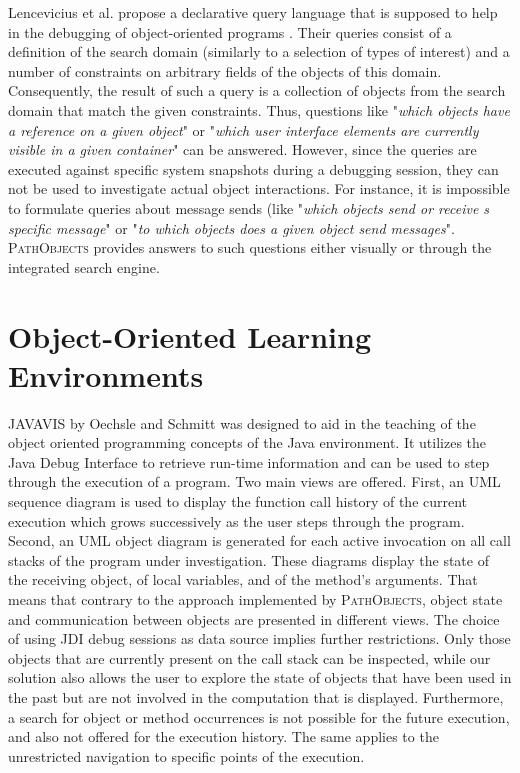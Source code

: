 Lencevicius et al. propose a declarative query language that is supposed to help in the debugging of object-oriented programs \cite{lencevicius_query-based_1997, guerraoui_dynamic_1999}.
Their queries consist of a definition of the search domain (similarly to a selection of types of interest) and a number of constraints on arbitrary fields of the objects of this domain.
Consequently, the result of such a query is a collection of objects from the search domain that match the given constraints.
Thus, questions like "\textit{which objects have a reference on a given object}" or "\textit{which user interface elements are currently visible in a given container}" can be answered.
However, since the queries are executed against specific system snapshots during a debugging session, they can not be used to investigate actual object interactions.
For instance, it is impossible to formulate queries about message sends (like "\textit{which objects send or receive s specific message}" or "\textit{to which objects does a given object send messages}".
\textsc{PathObjects} provides answers to such questions either visually or through the integrated search engine.

\section{Object-Oriented Learning Environments}
\textsc{JAVAVIS} by Oechsle and Schmitt \cite{diehl_javavis:_2002} was designed to aid in the teaching of the object oriented programming concepts of the Java environment.
It utilizes the Java Debug Interface to retrieve run-time information and can be used to step through the execution of a program.
Two main views are offered.
First, an UML sequence diagram is used to display the function call history of the current execution which grows successively as the user steps through the program.
Second, an UML object diagram is generated for each active invocation on all call stacks of the program under investigation.
These diagrams display the state of the receiving object, of local variables, and of the method's arguments.
That means that contrary to the approach implemented by \textsc{PathObjects}, object state and communication between objects are presented in different views.
The choice of using JDI debug sessions as data source implies further restrictions.
Only those objects that are currently present on the call stack can be inspected, while our solution also allows the user to explore the state of objects that have been used in the past but are not involved in the computation that is displayed.
Furthermore, a search for object or method occurrences is not possible for the future execution, and also not offered for the execution history.
The same applies to the unrestricted navigation to specific points of the execution.

